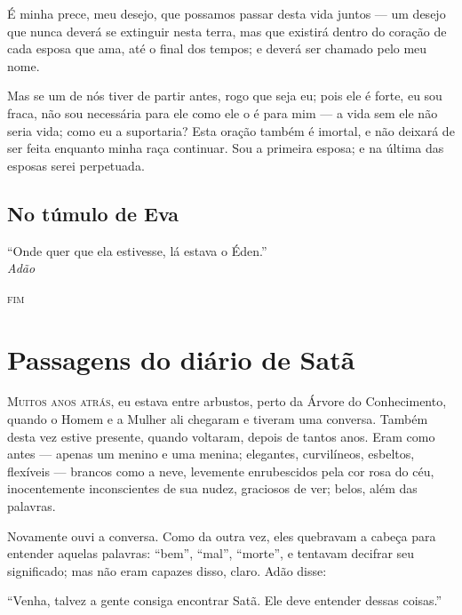 É minha prece, meu desejo, que possamos passar desta vida juntos --- um desejo
que nunca deverá se extinguir nesta terra, mas que existirá dentro do
coração de cada esposa que ama, até o final dos tempos; e deverá ser chamado pelo
meu nome.

Mas se um de nós tiver de partir antes, rogo que seja eu; pois ele é forte, eu
sou fraca, não sou necessária para ele como ele o é para mim --- a
vida sem ele não seria vida; como eu a suportaria? Esta oração também é
imortal, e não deixará de ser feita enquanto minha raça continuar. Sou a
primeira esposa; e na última das esposas serei perpetuada.

\begin{center}
\end{center}

\section*{No túmulo de Eva}
\medskip

``Onde quer que ela estivesse, lá estava o Éden.''
\\

\hfill\textit{Adão}  

\begin{center}
\textsc{fim}
\end{center}




\chapter[Passagens do diário de Satã]{Passagens do diário de Satã}

\textsc{Muitos anos atrás,} eu estava entre arbustos, perto da Árvore do
Conhecimento, quando o Homem e a Mulher ali chegaram e tiveram uma
conversa. Também desta vez estive presente, quando voltaram,
depois de tantos anos. Eram como antes --- apenas um menino e uma menina;
elegantes, curvilíneos, esbeltos, flexíveis --- brancos
como a neve, levemente enrubescidos pela cor rosa do céu, inocentemente
inconscientes de sua nudez, graciosos de ver; belos,
além das palavras.

Novamente ouvi a conversa. Como da outra vez, eles quebravam a cabeça
para entender aquelas palavras: ``bem'', ``mal'', ``morte'', e
tentavam decifrar seu significado; mas não eram capazes disso,
claro. Adão disse:

“Venha, talvez a gente consiga encontrar Satã. Ele deve entender dessas coisas.”

